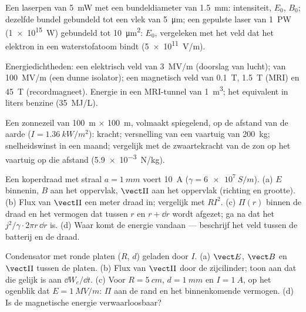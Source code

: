 \begin{exercise}[$\star$]\label{exo:b2:poynting-vector:2}
Een laserpen van \qty{5}{mW} met een bundeldiameter van \qty{1.5}{mm}:
intensiteit, $E_0$, $B_0$; dezelfde bundel gebundeld tot een vlek van
\qty{5}{\micro m}; een gepulste laser van \qty{1}{PW} (\qty{1e15}{W})
gebundeld tot \qty{10}{\micro m^2}: $E_0$, vergeleken met het veld dat het
elektron in een waterstofatoom bindt (\qty{5e11}{V/m}).
\end{exercise}

\begin{exercise}[$\star$]\label{exo:b2:poynting-vector:3}
Energiedichtheden: een elektrisch veld van \qty{3}{MV/m} (doorslag van
lucht); van \qty{100}{MV/m} (een dunne isolator); een magnetisch veld van
\qty{0.1}{T}, \qty{1.5}{T} (MRI) en \qty{45}{T} (recordmagneet). Energie in
een MRI-tunnel van \qty{1}{m^3}; het equivalent in liters benzine
(\qty{35}{MJ/L}).
\end{exercise}

\begin{exercise}[$\star$]\label{exo:b2:poynting-vector:4}
Een zonnezeil van \qty{100}{m} $\times$ \qty{100}{m}, volmaakt spiegelend,
op de afstand van de aarde ($I = \qty{1.36}{kW/m^2}$): kracht; versnelling
van een vaartuig van \qty{200}{kg}; snelheidswinst in een maand; vergelijk
met de zwaartekracht van de zon op het vaartuig op die afstand
(\qty{5.9e-3}{N/kg}).
\end{exercise}

\begin{exercise}[$\star\star$]\label{exo:b2:poynting-vector:5}
Een koperdraad met straal $a = \qty{1}{mm}$ voert \qty{10}{A}
($\gamma =
\qty{6e7}{S/m}$). (a) $E$ binnenin, $B$ aan het oppervlak,
$\vect\Pi$ aan het oppervlak (richting en grootte). (b) Flux van $\vect\Pi$
een meter draad in; vergelijk met $RI^2$. (c) $\Pi(r)$ binnen de draad en
het vermogen dat tussen $r$ en $r + \dd r$ wordt afgezet; ga na dat het
$j^2/\gamma\cdot2\pi r\,\dd r$ is. (d) Waar komt de energie vandaan ---
beschrijf het veld tussen de batterij en de draad.
\end{exercise}

\begin{exercise}[$\star\star$]\label{exo:b2:poynting-vector:6}
Condensator met ronde platen ($R$, $d$) geladen door $I$. (a) $\vect E$,
$\vect B$ en $\vect\Pi$ tussen de platen. (b) Flux van $\vect\Pi$ door de
zijcilinder; toon aan dat die gelijk is aan $\dd W_e/\dd t$. (c) Voor
$R = \qty{5}{cm}$, $d =
\qty{1}{mm}$ en $I = \qty{1}{A}$, op het ogenblik
dat $E = \qty{1}{MV/m}$: $\Pi$ aan de rand en het binnenkomende vermogen.
(d) Is de magnetische energie verwaarloosbaar?
\end{exercise}

